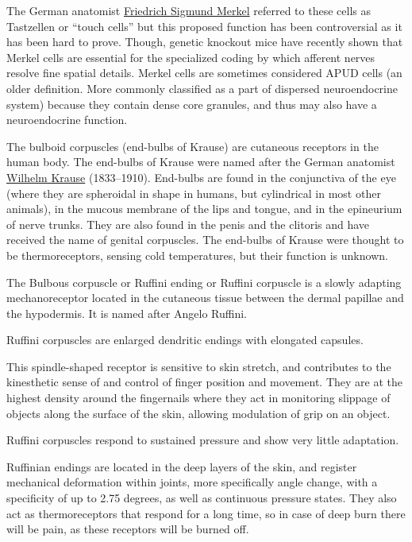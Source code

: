 The German anatomist
\href{https://en.wikipedia.org/wiki/Friedrich_Sigmund_Merkel}{Friedrich
Sigmund Merkel} referred to these cells as Tastzellen or ``touch cells''
but this proposed function has been controversial as it has been hard to
prove. Though, genetic knockout mice have recently shown that Merkel
cells are essential for the specialized coding by which afferent nerves
resolve fine spatial details. Merkel cells are sometimes considered APUD
cells (an older definition. More commonly classified as a part of
dispersed neuroendocrine system) because they contain dense core
granules, and thus may also have a neuroendocrine function.

The bulboid corpuscles (end-bulbs of Krause) are cutaneous receptors in
the human body. The end-bulbs of Krause were named after the German
anatomist \href{https://en.wikipedia.org/wiki/Wilhelm_Krause}{Wilhelm
Krause} (1833--1910). End-bulbs are found in the conjunctiva of the eye
(where they are spheroidal in shape in humans, but cylindrical in most
other animals), in the mucous membrane of the lips and tongue, and in
the epineurium of nerve trunks. They are also found in the penis and the
clitoris and have received the name of genital corpuscles. The end-bulbs
of Krause were thought to be thermoreceptors, sensing cold temperatures,
but their function is unknown.

The Bulbous corpuscle or Ruffini ending or Ruffini corpuscle is a slowly
adapting mechanoreceptor located in the cutaneous tissue between the
dermal papillae and the hypodermis. It is named after Angelo Ruffini.

Ruffini corpuscles are enlarged dendritic endings with elongated
capsules.

This spindle-shaped receptor is sensitive to skin stretch, and
contributes to the kinesthetic sense of and control of finger position
and movement. They are at the highest density around the fingernails
where they act in monitoring slippage of objects along the surface of
the skin, allowing modulation of grip on an object.

Ruffini corpuscles respond to sustained pressure and show very little
adaptation.

Ruffinian endings are located in the deep layers of the skin, and
register mechanical deformation within joints, more specifically angle
change, with a specificity of up to 2.75 degrees, as well as continuous
pressure states. They also act as thermoreceptors that respond for a
long time, so in case of deep burn there will be pain, as these
receptors will be burned off.

